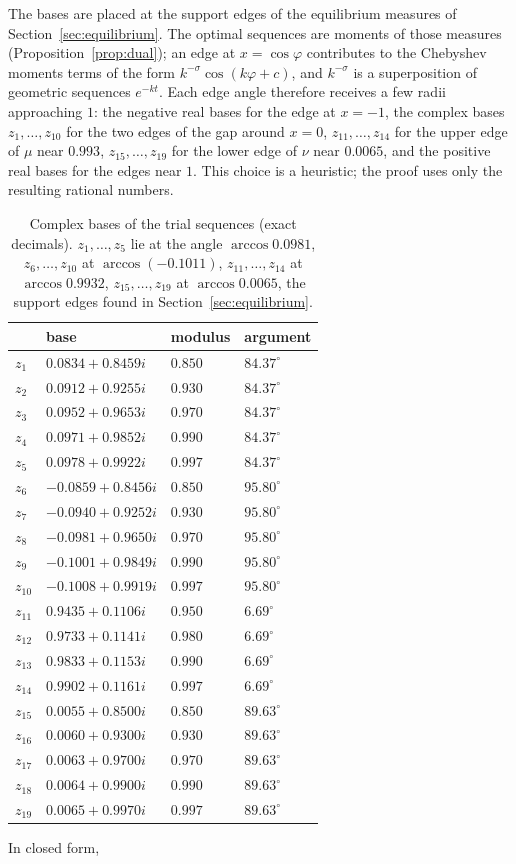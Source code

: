 \documentclass[11pt]{article}
\theoremstyle{definition}
\begin{document}
The bases are placed at the support edges of the equilibrium measures of Section~\ref{sec:equilibrium}. The optimal sequences are moments of those measures (Proposition~\ref{prop:dual}); an edge at $x=\cos\varphi$ contributes to the Chebyshev moments terms of the form $k^{-\sigma}\cos(k\varphi+c)$, and $k^{-\sigma}$ is a superposition of geometric sequences $e^{-kt}$. Each edge angle therefore receives a few radii approaching $1$: the negative real bases for the edge at $x=-1$, the complex bases $z_1,\dots,z_{10}$ for the two edges of the gap around $x=0$, $z_{11},\dots,z_{14}$ for the upper edge of $\mu$ near $0.993$, $z_{15},\dots,z_{19}$ for the lower edge of $\nu$ near $0.0065$, and the positive real bases for the edges near $1$. This choice is a heuristic; the proof uses only the resulting rational numbers.

\begin{table}[ht]
\centering
\small
\begin{tabular}{llll}
\toprule
 & base & modulus & argument\\
\midrule
$z_{1}$ & $0.0834+0.8459i$ & $0.850$ & $84.37^\circ$\\
$z_{2}$ & $0.0912+0.9255i$ & $0.930$ & $84.37^\circ$\\
$z_{3}$ & $0.0952+0.9653i$ & $0.970$ & $84.37^\circ$\\
$z_{4}$ & $0.0971+0.9852i$ & $0.990$ & $84.37^\circ$\\
$z_{5}$ & $0.0978+0.9922i$ & $0.997$ & $84.37^\circ$\\
$z_{6}$ & $-0.0859+0.8456i$ & $0.850$ & $95.80^\circ$\\
$z_{7}$ & $-0.0940+0.9252i$ & $0.930$ & $95.80^\circ$\\
$z_{8}$ & $-0.0981+0.9650i$ & $0.970$ & $95.80^\circ$\\
$z_{9}$ & $-0.1001+0.9849i$ & $0.990$ & $95.80^\circ$\\
$z_{10}$ & $-0.1008+0.9919i$ & $0.997$ & $95.80^\circ$\\
$z_{11}$ & $0.9435+0.1106i$ & $0.950$ & $6.69^\circ$\\
$z_{12}$ & $0.9733+0.1141i$ & $0.980$ & $6.69^\circ$\\
$z_{13}$ & $0.9833+0.1153i$ & $0.990$ & $6.69^\circ$\\
$z_{14}$ & $0.9902+0.1161i$ & $0.997$ & $6.69^\circ$\\
$z_{15}$ & $0.0055+0.8500i$ & $0.850$ & $89.63^\circ$\\
$z_{16}$ & $0.0060+0.9300i$ & $0.930$ & $89.63^\circ$\\
$z_{17}$ & $0.0063+0.9700i$ & $0.970$ & $89.63^\circ$\\
$z_{18}$ & $0.0064+0.9900i$ & $0.990$ & $89.63^\circ$\\
$z_{19}$ & $0.0065+0.9970i$ & $0.997$ & $89.63^\circ$\\
\bottomrule
\end{tabular}
\caption{Complex bases of the trial sequences (exact decimals). $z_1,\dots,z_5$ lie at the angle $\arccos0.0981$, $z_6,\dots,z_{10}$ at $\arccos(-0.1011)$, $z_{11},\dots,z_{14}$ at $\arccos0.9932$, $z_{15},\dots,z_{19}$ at $\arccos0.0065$, the support edges found in Section~\ref{sec:equilibrium}.}\label{tab:bases}
\end{table} In closed form,
\end{document}
